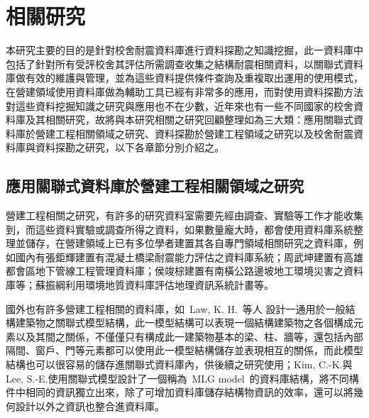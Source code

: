 \renewcommand\thetable{\arabic{chapter}-\arabic{table}}
\renewcommand{\theequation}{\arabic{chapter}-\arabic{equation}}
\chapter{相關研究}
\label{cha:relative-works} 

本研究主要的目的是針對校舍耐震資料庫進行資料探勘之知識挖掘，此一資料庫中包括了針對所有受評校舍其評估所需調查收集之結構耐震相關資料，以關聯式資料庫做有效的維護與管理，並為這些資料提供條件查詢及重複取出運用的使用模式，在營建領域使用資料庫做為輔助工具已經有非常多的應用，而對使用資料探勘方法對這些資料挖掘知識之研究與應用也不在少數，近年來也有一些不同國家的校舍資料庫及其相關研究，故將與本研究相關之研究回顧整理如為三大類：應用關聯式資料庫於營建工程相關領域之研究、資料探勘於營建工程領域之研究以及校舍耐震資料庫與資料探勘之研究，以下各章節分別介紹之。

\section{應用關聯式資料庫於營建工程相關領域之研究}
 
營建工程相關之研究，有許多的研究資料室需要先經由調查、實驗等工作才能收集到，而這些資料實驗或調查所得之資料，如果數量龐大時，都會使用資料庫系統整理並儲存，在營建領域上已有多位學者建置其各自專門領域相關研究之資料庫，例如國內有張鉅輝\cite{chang2003master}建置有混凝土橋梁耐震能力評估之資料庫系統；周武坤\cite{chou2002master}建置有高雄都會區地下管線工程管理資料庫；侯竣棕\cite{hou2000master}建置有南橫公路邊坡地工環境災害之資料庫等；蘇振綱\cite{su2000master}利用環境地質資料庫評估地理資訊系統計畫等。

國外也有許多營建工程相關的資料庫，如~Law, K. H.~等人\cite{law1990management} 設計一通用於一般結構建築物之關聯式模型結構，此一模型結構可以表現一個結構建築物之各個構成元素以及其間之關係，不僅僅只有構成此一建築物基本的梁、柱、牆等，還包括內部隔間、窗戶、門等元素都可以使用此一模型結構儲存並表現相互的關係，而此模型結構也可以很容易的儲存進關聯式資料庫內，供後續之研究使用；Kim, C.-K.與 Lee, S.-E.\cite{kim2000study}使用關聯式模型設計了一個稱為~MLG model~的資料庫結構，將不同構件中相同的資訊獨立出來，除了可增加資料庫儲存結構物資訊的效率，還可以將幾何設計以外之資訊也整合進資料庫。


